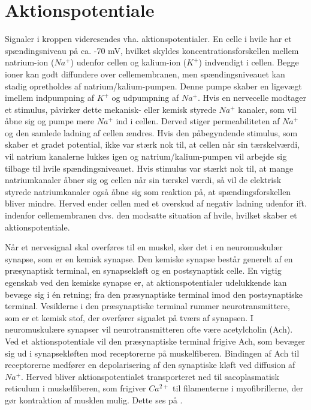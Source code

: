 \section{Aktionspotentiale}
Signaler i kroppen videresendes vha. aktionspotentialer. En celle i hvile har et spændingsniveau på ca. -70 mV, hvilket skyldes koncentrationsforskellen mellem natrium-ion ($Na^{+}$) udenfor cellen og kalium-ion ($K^{+}$) indvendigt i cellen. Begge ioner kan godt diffundere over cellemembranen, men spændingsniveauet kan stadig opretholdes af natrium/kalium-pumpen. Denne pumpe skaber en ligevægt imellem indpumpning af $K^{+}$ og udpumpning af $Na^{+}$. Hvis en nervecelle modtager et stimulus, påvirker dette mekanisk- eller kemisk styrede $Na^{+}$ kanaler, som vil åbne sig og pumpe mere $Na^{+}$ ind i cellen. Derved stiger permeabiliteten af $Na^{+}$ og den samlede ladning af cellen ændres. Hvis den påbegyndende stimulus, som skaber et gradet potential, ikke var stærk nok til, at cellen når sin tærskelværdi, vil natrium kanalerne lukkes igen og natrium/kalium-pumpen vil arbejde sig tilbage til hvile spændingsniveauet. Hvis stimulus var stærkt nok til, at mange natriumkanaler åbner sig og cellen når sin tærskel værdi, så vil de elektrisk styrede natriumkanaler også åbne sig som reaktion på, at spændingsforskellen bliver mindre. Herved ender cellen med et overskud af negativ ladning udenfor ift. indenfor cellemembranen dvs. den modsatte situation af hvile, hvilket skaber et aktionspotentiale. \cite{Martini2012,Stanfield2014}

Når et nervesignal skal overføres til en muskel, sker det i en neuromuskulær synapse, som er en kemisk synapse. Den kemiske synapse består generelt af en præsynaptisk terminal, en synapsekløft og en postsynaptisk celle. En vigtig egenskab ved den kemiske synapse er, at aktionspotentialer udelukkende kan bevæge sig i én retning; fra den præsynaptiske terminal imod den postsynaptiske terminal.\cite{Hall2015} Vesiklerne i den præsynaptiske terminal rummer neurotransmittere, som er et kemisk stof, der overfører signalet på tværs af synapsen. I neuromuskulære synapser vil neurotransmitteren ofte være acetylcholin (Ach). Ved et aktionspotentiale vil den præsynaptiske terminal frigive Ach, som bevæger sig ud i synapsekløften mod receptorerne på muskelfiberen. Bindingen af Ach til receptorerne medfører en depolarisering af den synaptiske kløft ved diffusion af $Na^{+}$. Herved bliver aktionspotentialet transporteret ned til sacoplasmatisk reticulum i muskelfiberen, som frigiver $Ca^{2+}$ til filamenterne i myofibrillerne, der gør kontraktion af musklen mulig.\cite{Hall2015,Martini2012} Dette ses på .


